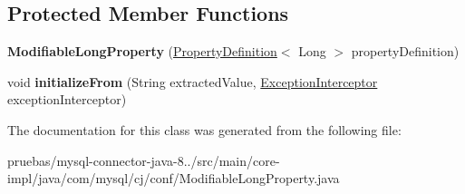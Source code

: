 \subsection*{Protected Member Functions}
\begin{DoxyCompactItemize}
\item 
\mbox{\label{classcom_1_1mysql_1_1cj_1_1conf_1_1_modifiable_long_property_a913cd338fec2ae8883ce970c5a5f3db6}} 
{\bfseries Modifiable\+Long\+Property} (\mbox{\hyperlink{interfacecom_1_1mysql_1_1cj_1_1conf_1_1_property_definition}{Property\+Definition}}$<$ Long $>$ property\+Definition)
\item 
\mbox{\label{classcom_1_1mysql_1_1cj_1_1conf_1_1_modifiable_long_property_a48083a3996ca049922f07be5ca84f20d}} 
void {\bfseries initialize\+From} (String extracted\+Value, \mbox{\hyperlink{interfacecom_1_1mysql_1_1cj_1_1exceptions_1_1_exception_interceptor}{Exception\+Interceptor}} exception\+Interceptor)
\end{DoxyCompactItemize}


The documentation for this class was generated from the following file\+:\begin{DoxyCompactItemize}
\item 
pruebas/mysql-\/connector-\/java-\/8../src/main/core-\/impl/java/com/mysql/cj/conf/Modifiable\+Long\+Property.\+java\end{DoxyCompactItemize}
